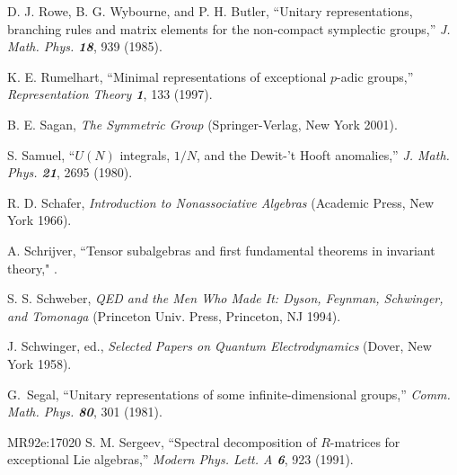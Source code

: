  D. J. Rowe, B. G. Wybourne, and P. H. Butler,
    ``Unitary representations, branching rules and matrix elements
      for the non-compact symplectic groups,''
    {\em J. Math. Phys. \bf 18}, 939 (1985). %

 K. E. Rumelhart, %
    ``Minimal representations of exceptional $p$-adic groups,''
    {\em Representation Theory \bf 1}, 133 (1997). %


 B. E. Sagan,
     {\em The Symmetric Group}
    (Springer-Verlag, New York 2001).

S. Samuel,
``$U(N)$ integrals, $1/N$, and the Dewit-'t Hooft anomalies,''
{\em J.  Math.  Phys.    \bf 21}, 2695 (1980).

 R. D. Schafer,
{\em Introduction to Nonassociative Algebras}
(Academic Press, New York 1966).

 A. Schrijver,
    ``Tensor subalgebras and first fundamental theorems in invariant theory,"
    .



 S. S. Schweber,
    {\em QED and the Men Who Made It:
         Dyson, Feynman, Schwinger, and Tomonaga}
    (Princeton Univ. Press, Princeton, NJ 1994).

 J. Schwinger, ed.,
    {\em Selected Papers on Quantum Electrodynamics}
        (Dover, New York 1958).

 G.\  Segal,
    ``Unitary representations of some infinite-dimensional groups,''
    {\em Comm. Math. Phys. \bf 80}, 301 (1981).

        {MR92e:17020}
S. M. Sergeev,
``Spectral decomposition of $R$-matrices for
  exceptional Lie algebras,''
{\em Modern Phys. Lett. A  \bf 6}, 923 (1991). %

